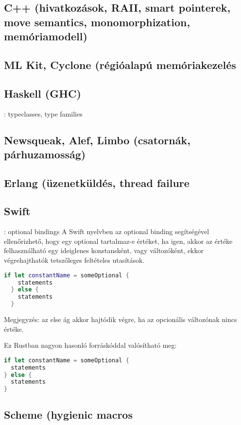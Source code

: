 \subsection{C++ (hivatkozások, RAII, smart pointerek, move semantics, monomorphization, memóriamodell)} 

\subsection{ML Kit, Cyclone (régióalapú memóriakezelés}

\subsection{Haskell (GHC)}: typeclasses, type families

\subsection{Newsqueak, Alef, Limbo (csatornák, párhuzamosság)}

\subsection{Erlang (üzenetküldés, thread failure}

\subsection{Swift}: optional bindings
A Swift nyelvben az optional binding segítségével ellenőrizhető, hogy egy optional tartalmaz-e értéket, ha igen, akkor az értéke felhasználható egy ideiglenes konstansként, vagy változóként, ekkor végrehajthatók tetszőleges feltételes utasítások. %
\begin{lstlisting}[language=Swift]
  if let constantName = someOptional {
    statements
  } else {
    statements
  }
\end{lstlisting}
Megjegyzés: az else ág akkor hajtódik végre, ha az opcionális változónak nincs értéke.

Ez Rustban nagyon hasonló forráskóddal valósítható meg:
\begin{lstlisting}[language=Rust, style=boxed, style=colouredRust]
if let constantName = someOptional {
  statements
} else {
  statements
}
\end{lstlisting}

\subsection{Scheme (hygienic macros}

